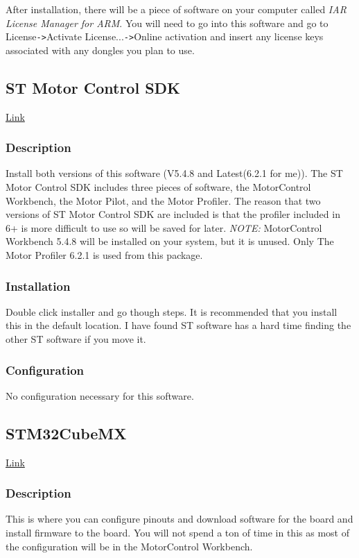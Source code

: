 \documentclass[10pt]{article}
\begin{document}
                After installation, there will be a piece of software on your computer called \emph{IAR License Manager for ARM}. You will need to go into this software and go to License\texttt{->}Activate License...\texttt{->}Online activation and insert any license keys associated with any dongles you plan to use. 
		\FloatBarrier \subsection{ST Motor Control SDK}
            \href{https://www.st.com/en/embedded-software/x-cube-mcsdk.html}{Link}
			\FloatBarrier \subsubsection{Description} 
                Install both versions of this software (V5.4.8 and Latest(6.2.1 for me)). The ST Motor Control SDK includes three pieces of software, the MotorControl Workbench, the Motor Pilot, and the Motor Profiler. The reason that two versions of ST Motor Control SDK are included is that the profiler included in 6+ is more difficult to use so will be saved for later. \emph{NOTE:} MotorControl Workbench 5.4.8 will be installed on your system, but it is unused. Only The Motor Profiler 6.2.1 is used from this package.
			\FloatBarrier \subsubsection{Installation}
                Double click installer and go though steps. It is recommended that you install this in the default location. I have found ST software has a hard time finding the other ST software if you move it.
			\FloatBarrier \subsubsection{Configuration}
                No configuration necessary for this software.
		\FloatBarrier \subsection{STM32CubeMX}
            \href{https://www.st.com/en/development-tools/stm32cubemx.html}{Link}
			\FloatBarrier \subsubsection{Description} 
                This is where you can configure pinouts and download software for the board and install firmware to the board. You will not spend a ton of time in this as most of the configuration will be in the MotorControl Workbench.
\end{document}
